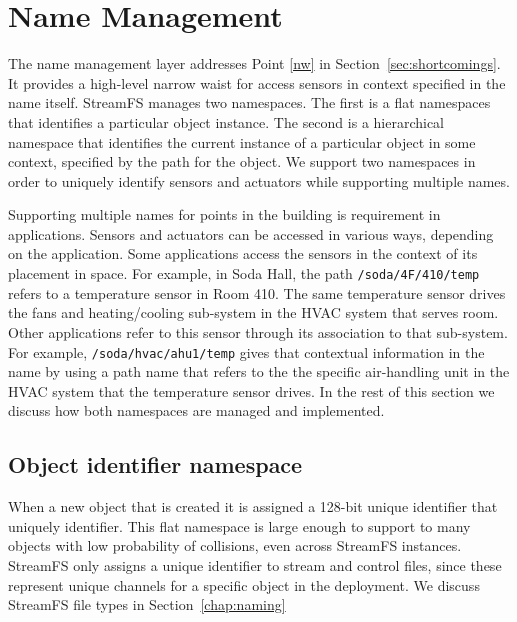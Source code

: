 \section{Name Management}
The name management layer addresses Point \ref{nw} in Section~\ref{sec:shortcomings}.  It provides a high-level
narrow waist for access sensors in context specified in the name itself.
StreamFS manages two namespaces.  The first is a flat namespaces that identifies a particular
object instance.  The second is a hierarchical namespace that identifies the current instance
of a particular object in some context, specified by the path for the object.  
We support two namespaces in order to uniquely identify sensors and actuators while supporting multiple names.

Supporting multiple names for points in the building is requirement in applications.  Sensors and actuators can be accessed in various 
ways, depending on the application.  Some applications access the sensors in the context of its placement 
in space.  For example, in Soda Hall, the path \texttt{/soda/4F/410/temp} refers to a temperature sensor in Room 410.  
The same temperature sensor drives the fans and heating/cooling sub-system in the HVAC system that serves room.
Other applications refer to this sensor through its association to that sub-system.  For example,
\texttt{/soda/hvac/ahu1/temp} gives that contextual information in the name by using a path name that refers to the the specific
air-handling unit in the HVAC system that the temperature sensor drives.
In the rest of this section we discuss how both namespaces are managed and implemented.

\subsection{Object identifier namespace}

When a new object that is created it is assigned a 128-bit unique identifier that uniquely identifier. %
This flat namespace is large enough to support to many objects with low probability of collisions, even across
StreamFS instances.
StreamFS only assigns a unique identifier to stream and control files, since these represent unique channels for a specific 
object in the deployment.  We discuss StreamFS file types in Section~\ref{chap:naming}


